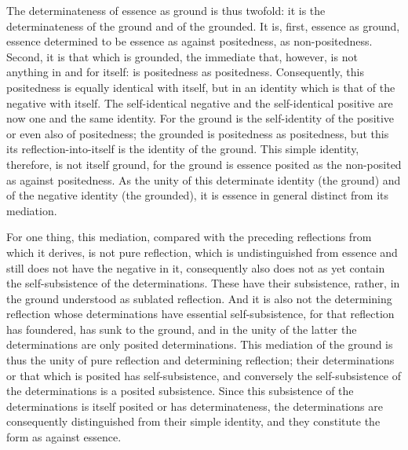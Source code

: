 The determinateness of essence as ground is thus twofold:
it is the determinateness of the ground and of the grounded.
It is, first, essence as ground,
essence determined to be essence
as against positedness, as non-positedness.
Second, it is that which is grounded,
the immediate that, however, is not anything in and for itself:
is positedness as positedness.
Consequently, this positedness is equally identical with itself,
but in an identity which is that of the negative with itself.
The self-identical negative and the self-identical positive
are now one and the same identity.
For the ground is the self-identity
of the positive or even also of positedness;
the grounded is positedness as positedness,
but this its reflection-into-itself is the identity of the ground.
This simple identity, therefore, is not itself ground,
for the ground is essence posited as
the non-posited as against positedness.
As the unity of this determinate identity (the ground)
and of the negative identity (the grounded),
it is essence in general distinct from its mediation.

For one thing, this mediation,
compared with the preceding reflections
from which it derives,
is not pure reflection,
which is undistinguished from essence
and still does not have the negative in it,
consequently also does not as yet contain
the self-subsistence of the determinations.
These have their subsistence, rather,
in the ground understood as sublated reflection.
And it is also not the determining reflection
whose determinations have essential self-subsistence,
for that reflection has foundered, has sunk to the ground,
and in the unity of the latter
the determinations are only posited determinations.
This mediation of the ground is thus
the unity of pure reflection and determining reflection;
their determinations or that which is posited has self-subsistence,
and conversely the self-subsistence of
the determinations is a posited subsistence.
Since this subsistence of the determinations is
itself posited or has determinateness,
the determinations are consequently distinguished
from their simple identity,
and they constitute the form as against essence.

